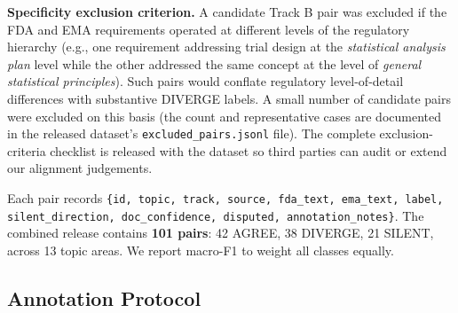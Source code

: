 \documentclass[manuscript]{acmart}
\begin{document}
\begin{revblock}
\textbf{Specificity exclusion criterion.}
A candidate Track B pair was excluded if the FDA and EMA requirements operated
at different levels of the regulatory hierarchy (e.g., one requirement
addressing trial design at the \textit{statistical analysis plan} level while
the other addressed the same concept at the level of \textit{general
statistical principles}). Such pairs would conflate regulatory
level-of-detail differences with substantive DIVERGE labels.
A small number of candidate pairs were excluded on this basis (the count and
representative cases are documented in the released dataset's
\texttt{excluded\_pairs.jsonl} file). The complete exclusion-criteria checklist
is released with the dataset so third parties can audit or extend our alignment
judgements.

Each pair records
\texttt{\{id, topic, track, source, fda\_text, ema\_text, label,
silent\_direction, doc\_confidence, disputed, annotation\_notes\}}.
The combined release contains \textbf{101 pairs}: 42 AGREE, 38 DIVERGE, 21
SILENT, across 13 topic areas. We report macro-F1 to weight all classes equally.
\end{revblock}

\subsection{Annotation Protocol}
\label{sec:annotation}
\end{document}
